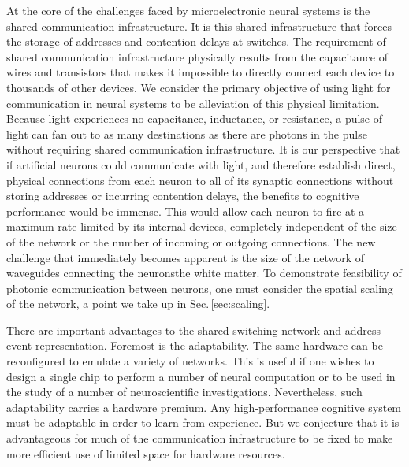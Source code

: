 \documentclass[twocolumn]{article}
\begin{document}
At the core of the challenges faced by microelectronic neural systems is the shared communication infrastructure. It is this shared infrastructure that forces the storage of addresses and contention delays at switches. The requirement of shared communication infrastructure physically results from the capacitance of wires and transistors that makes it impossible to directly connect each device to thousands of other devices. We consider the primary objective of using light for communication in neural systems to be alleviation of this physical limitation. Because light experiences no capacitance, inductance, or resistance, a pulse of light can fan out to as many destinations as there are photons in the pulse without requiring shared communication infrastructure. It is our perspective that if artificial neurons could communicate with light, and therefore establish direct, physical connections from each neuron to all of its synaptic connections without storing addresses or incurring contention delays, the benefits to cognitive performance would be immense. This would allow each neuron to fire at a maximum rate limited by its internal devices, completely independent of the size of the network or the number of incoming or outgoing connections. The new challenge that immediately becomes apparent is the size of the network of waveguides connecting the neurons\textemdash the white matter. To demonstrate feasibility of photonic communication between neurons, one must consider the spatial scaling of the network, a point we take up in Sec.\,\ref{sec:scaling}.

There are important advantages to the shared switching network and address-event representation. Foremost is the adaptability. The same hardware can be reconfigured to emulate a variety of networks. This is useful if one wishes to design a single chip to perform a number of neural computation or to be used in the study of a number of neuroscientific investigations. Nevertheless, such adaptability carries a hardware premium. Any high-performance cognitive system must be adaptable in order to learn from experience. But we conjecture that it is advantageous for much of the communication infrastructure to be fixed to make more efficient use of limited space for hardware resources.
\end{document}
